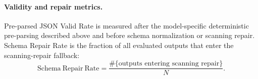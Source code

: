 \documentclass[10pt]{article}
\begin{document}
\paragraph{Validity and repair metrics.}
Pre-parsed JSON Valid Rate is measured after the model-specific deterministic pre-parsing described above and before schema normalization or scanning repair. Schema Repair Rate is the fraction of all evaluated outputs that enter the scanning-repair fallback:
\[
\mathrm{Schema\ Repair\ Rate}
=
\frac{\#\{\text{outputs entering scanning repair}\}}{N}.
\]
\end{document}

